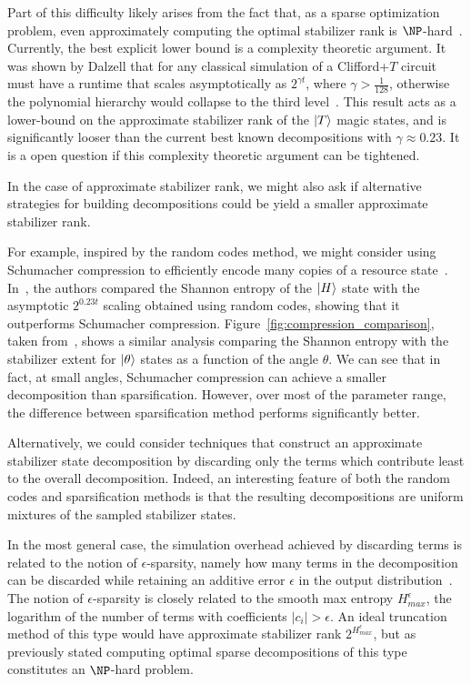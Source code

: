 Part of this difficulty likely arises from the fact that, as a sparse optimization problem, even approximately computing the optimal stabilizer rank is $\NP$-hard~\cite{Natarajan1995}. Currently, the best explicit lower bound is a complexity theoretic argument. It was shown by Dalzell that for any classical simulation of a Clifford+$T$ circuit must have a runtime that scales asymptotically as $2^{\gamma t}$, where $\gamma > \frac{1}{128}$, otherwise the polynomial hierarchy would collapse to the third level~\cite{Dalzell2017}. This result acts as a lower-bound on the approximate stabilizer rank of the $\ket{T}$ magic states, and is significantly looser than the current best known decompositions with $\gamma\approx 0.23$. It is a open question if this complexity theoretic argument can be tightened.\par
In the case of approximate stabilizer rank, we might also ask if alternative strategies for building decompositions could be yield a smaller approximate stabilizer rank.\par
For example, inspired by the random codes method, we might consider using Schumacher compression to efficiently encode many copies of a resource state~\cite{Schumacher1995}. In~\cite{Bravyi2016}, the authors compared the Shannon entropy of the $\ket{H}$ state with the asymptotic $2^{0.23t}$ scaling obtained using random codes, showing that it outperforms Schumacher compression. Figure~\ref{fig:compression_comparison}, taken from~\cite{Bravyi2017}, shows a similar analysis comparing the Shannon entropy with the stabilizer extent for $\ket{\theta}$ states as a function of the angle $\theta$. We can see that in fact, at small angles, Schumacher compression can achieve a smaller decomposition than sparsification. However, over most of the parameter range, the difference between sparsification method performs significantly better.\par
Alternatively, we could consider techniques that construct an approximate stabilizer state decomposition by discarding only the terms which contribute least to the overall decomposition. Indeed, an interesting feature of both the random codes and sparsification methods is that the resulting decompositions are uniform mixtures of the sampled stabilizer states.\par
In the most general case, the simulation overhead achieved by discarding terms is related to the notion of $\epsilon$-sparsity, namely how many terms in the decomposition can be discarded while retaining an additive error $\epsilon$ in the output distribution~\cite{Pashayan2017}. The notion of $\epsilon$-sparsity is closely related to the smooth max entropy $H_{max}^{\epsilon}$, the logarithm of the number of terms with coefficients $\left|c_{i}\right|>\epsilon$. An ideal truncation method of this type would have approximate stabilizer rank $2^{H_{max}^{\epsilon}}$, but as previously stated computing optimal sparse decompositions of this type constitutes an $\NP$-hard problem.\par
